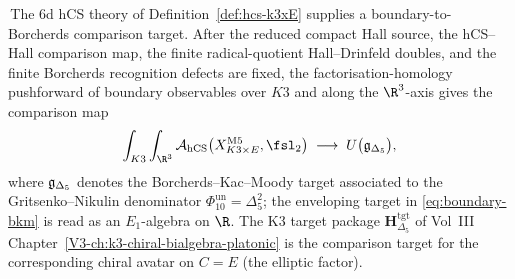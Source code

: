 \begin{theorem}
\label{thm:hcs-k3xE-bkm-identification}
%
%
\ClaimStatusConditional\,The 6d hCS theory of
Definition~\ref{def:hcs-k3xE} supplies a boundary-to-Borcherds
comparison target. After the reduced compact Hall source, the
hCS--Hall comparison map, the finite radical-quotient
Hall--Drinfeld doubles, and the finite Borcherds recognition defects
are fixed,
the factorisation-homology pushforward of boundary observables over
$K3$ and along the $\R^3$-axis gives the comparison map
\begin{equation}
\label{eq:boundary-bkm}
 \int_{K3}\int_{\R^3}
 \cA_{\hCS}\bigl(X_{K3\times E}^{\mathrm{M5}},\fsl_2\bigr)
 \;\longrightarrow\;
 U\bigl(\fg_{\Delta_5}\bigr),
\end{equation}
where $\mathfrak{g}_{\Delta_5}$ denotes the Borcherds--Kac--Moody target
associated to the Gritsenko--Nikulin denominator
$\Phi_{10}^{\mathrm{un}}=\Delta_5^2$; the enveloping target in
\eqref{eq:boundary-bkm} is read as an $E_1$-algebra on $\R$. The K3
target package
$\mathbf{H}_{\Delta_5}^{\mathrm{tgt}}$ of Vol~III
Chapter~\ref{V3-ch:k3-chiral-bialgebra-platonic} is the comparison
target for the corresponding chiral avatar on $C = E$ (the elliptic
factor).
\end{theorem}

